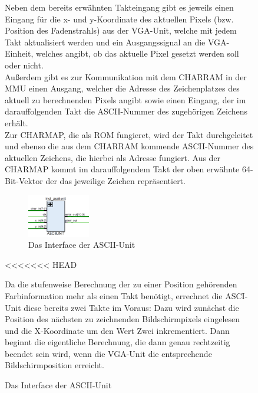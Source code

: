 \begin{figure}[H]
Neben dem bereits erw\"ahnten Takteingang gibt es jeweils einen Eingang f\"ur die x- und y-Koordinate des aktuellen Pixels (bzw. Position des Fadenstrahls) aus der VGA-Unit, welche mit jedem Takt aktualisiert werden und ein Ausgangssignal an die VGA-Einheit, welches angibt, ob das aktuelle Pixel gesetzt werden soll oder nicht.\\ Au{\ss}erdem gibt es zur Kommunikation mit dem CHARRAM in der MMU einen Ausgang, welcher die Adresse des Zeichenplatzes des aktuell zu berechnenden Pixels angibt sowie einen Eingang, der im darauffolgenden Takt die ASCII-Nummer des zugeh\"origen Zeichens erh\"alt.\\
Zur CHARMAP, die als ROM fungieret, wird der Takt durchgeleitet und ebenso die aus dem CHARRAM kommende ASCII-Nummer des aktuellen Zeichens, die hierbei als Adresse fungiert. Aus der CHARMAP kommt im darauffolgendem Takt der oben erw\"ahnte 64-Bit-Vektor der das jeweilige Zeichen repr\"asentiert.

\begin{figure}[H]
	\centering
	\label{fig:interface}
		\includegraphics[width=0.3\textwidth]{Asciiunit.png}
	\caption[Interface der ASCII-Unit]{Das Interface der ASCII-Unit}
\end{figure}

<<<<<<< HEAD

Da die stufenweise Berechnung der zu einer Position geh\"orenden Farbinformation mehr als einen Takt ben\"otigt, errechnet die ASCI-Unit diese bereits zwei Takte im Voraus: Dazu wird zun\"achst die Position des n\"achsten zu zeichnenden Bildschirmpixels eingelesen und die X-Koordinate um den Wert Zwei inkrementiert. Dann beginnt die eigentliche Berechnung, die dann genau rechtzeitig beendet sein wird, wenn die VGA-Unit die entsprechende Bildschirmposition erreicht.


\end{figure}
